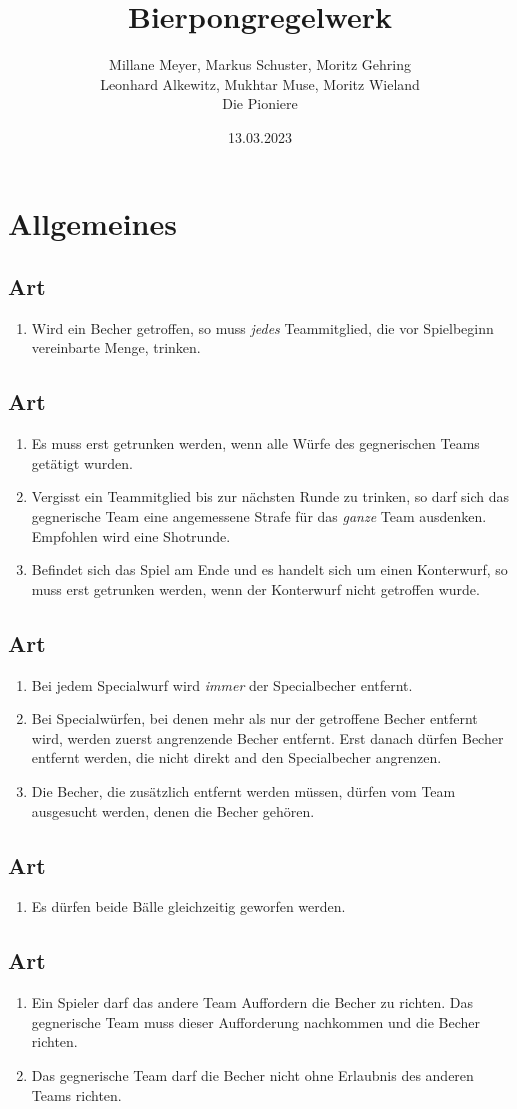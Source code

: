 \documentclass[a4paper,11pt]{scrartcl}
\title{\Huge{Bierpongregelwerk}}
\author{Millane Meyer, Markus Schuster, Moritz Gehring \\Leonhard Alkewitz, Mukhtar Muse, Moritz Wieland \\\tiny{Die Pioniere}}
\date{\small{13.03.2023}}
\newcommand{\enum}[1]{\begin{enumerate}[label=(\arabic*)]#1\end{enumerate}}
\newcommand{\art}[2]{\subsection*{#1} \enum{#2}}
\newcounter{art}
\begin{document}
\maketitle
\vspace*{-1cm}
\newpage

\section{Allgemeines}
    \art{Art \theart}{
        \item
            Wird ein Becher getroffen, so muss \emph{jedes} Teammitglied, die vor Spielbeginn vereinbarte Menge, trinken.
    }

    \art{Art \theart}{
        \item
            Es muss erst getrunken werden, wenn alle Würfe des gegnerischen Teams getätigt wurden.
        \item
            Vergisst ein Teammitglied bis zur nächsten Runde zu trinken, so darf sich das gegnerische Team eine angemessene Strafe für das \emph{ganze} Team ausdenken. Empfohlen wird eine Shotrunde.
        \item
            Befindet sich das Spiel am Ende und es handelt sich um einen Konterwurf, so muss erst getrunken werden, wenn der Konterwurf nicht getroffen wurde.
    }

    \art{Art \theart}{
        \item
            Bei jedem Specialwurf wird \emph{immer} der Specialbecher entfernt.
        \item
            Bei Specialwürfen, bei denen mehr als nur der getroffene Becher entfernt wird, werden zuerst angrenzende Becher entfernt. Erst danach dürfen Becher entfernt werden, die nicht direkt and den Specialbecher angrenzen.
        \item
            Die Becher, die zusätzlich entfernt werden müssen, dürfen vom Team ausgesucht werden, denen die Becher gehören.
    }

    \art{Art \theart}{
        \item
            Es dürfen beide Bälle gleichzeitig geworfen werden.
    }

    \art{Art \theart}{
        \item
            Ein Spieler darf das andere Team Auffordern die Becher zu richten. Das gegnerische Team muss dieser Aufforderung nachkommen und die Becher richten.
        \item
            Das gegnerische Team darf die Becher nicht ohne Erlaubnis des anderen Teams richten.
    }
\end{document}
